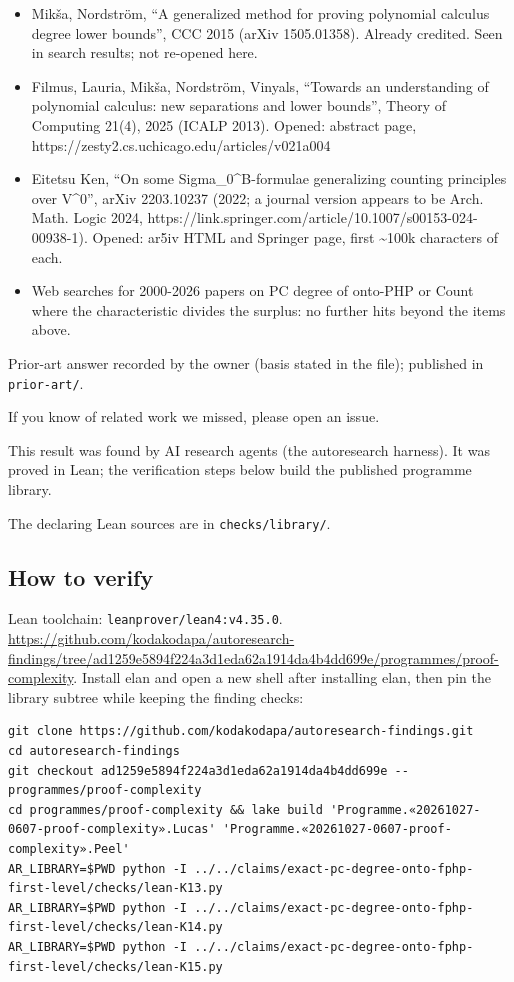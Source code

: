\documentclass{article}
\begin{document}
\begin{itemize}
\item Mikša, Nordström, ``A generalized method for proving polynomial calculus degree lower bounds'', CCC 2015 (arXiv 1505.01358). Already credited. Seen in search results; not re-opened here.
\item Filmus, Lauria, Mikša, Nordström, Vinyals, ``Towards an understanding of polynomial calculus: new separations and lower bounds'', Theory of Computing 21(4), 2025 (ICALP 2013). Opened: abstract page, https://zesty2.cs.uchicago.edu/articles/v021a004
\item Eitetsu Ken, ``On some Sigma\_0\textasciicircum{}B-formulae generalizing counting principles over V\textasciicircum{}0'', arXiv 2203.10237 (2022; a journal version appears to be Arch. Math. Logic 2024, https://link.springer.com/article/10.1007/s00153-024-00938-1). Opened: ar5iv HTML and Springer page, first \textasciitilde{}100k characters of each.
\item Web searches for 2000-2026 papers on PC degree of onto-PHP or Count where the characteristic divides the surplus: no further hits beyond the items above.
\end{itemize}

Prior-art answer recorded by the owner (basis stated in the file); published in \texttt{prior-art/}.

If you know of related work we missed, please open an issue.

This result was found by AI research agents (the autoresearch harness). It was proved in Lean; the verification steps below build the published programme library.

The declaring Lean sources are in \texttt{checks/library/}.

\subsection*{How to verify}

Lean toolchain: \texttt{leanprover/lean4:v4.35.0}. \url{https://github.com/kodakodapa/autoresearch-findings/tree/ad1259e5894f224a3d1eda62a1914da4b4dd699e/programmes/proof-complexity}. Install elan and open a new shell after installing elan, then pin the library subtree while keeping the finding checks:

\begin{verbatim}
git clone https://github.com/kodakodapa/autoresearch-findings.git
cd autoresearch-findings
git checkout ad1259e5894f224a3d1eda62a1914da4b4dd699e -- programmes/proof-complexity
cd programmes/proof-complexity && lake build 'Programme.«20261027-0607-proof-complexity».Lucas' 'Programme.«20261027-0607-proof-complexity».Peel'
AR_LIBRARY=$PWD python -I ../../claims/exact-pc-degree-onto-fphp-first-level/checks/lean-K13.py
AR_LIBRARY=$PWD python -I ../../claims/exact-pc-degree-onto-fphp-first-level/checks/lean-K14.py
AR_LIBRARY=$PWD python -I ../../claims/exact-pc-degree-onto-fphp-first-level/checks/lean-K15.py
\end{verbatim}
\end{document}

